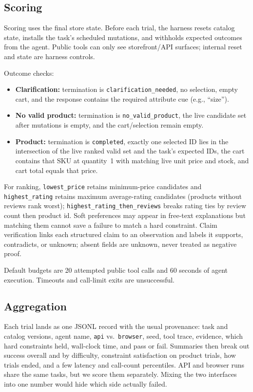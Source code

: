 \documentclass{article} %
\begin{document}
\subsection{Scoring}

Scoring uses the final store state. Before each trial, the harness resets catalog state, installs the task's scheduled mutations, and withholds expected outcomes from the agent. Public tools can only see storefront/API surfaces; internal reset and state are harness controls.

Outcome checks:
\begin{itemize}[leftmargin=*,noitemsep,topsep=0pt]
    \item \textbf{Clarification:} termination is \texttt{clarification\_needed}, no selection, empty cart, and the response contains the required attribute cue (e.g., ``size'').
    \item \textbf{No valid product:} termination is \texttt{no\_valid\_product}, the live candidate set after mutations is empty, and the cart/selection remain empty.
    \item \textbf{Product:} termination is \texttt{completed}, exactly one selected ID lies in the intersection of the live ranked valid set and the task's expected IDs, the cart contains that SKU at quantity~1 with matching live unit price and stock, and cart total equals that price.
\end{itemize}

For ranking, \texttt{lowest\_price} retains minimum-price candidates and \texttt{highest\_rating} retains maximum average-rating candidates (products without reviews rank worst); \texttt{highest\_rating\_then\_reviews} breaks rating ties by review count then product id. Soft preferences may appear in free-text explanations but matching them cannot save a failure to match a hard constraint. Claim verification links each structured claim to an observation and labels it supports, contradicts, or unknown; absent fields are unknown, never treated as negative proof.

Default budgets are 20 attempted public tool calls and 60 seconds of agent execution. Timeouts and call-limit exits are unsuccessful.

\subsection{Aggregation}

Each trial lands as one JSONL record with the usual provenance: task and catalog versions, agent name, \texttt{api} vs.\ \texttt{browser}, seed, tool trace, evidence, which hard constraints held, wall-clock time, and pass or fail. Summaries then break out success overall and by difficulty, constraint satisfaction on product trials, how trials ended, and a few latency and call-count percentiles. API and browser runs share the same tasks, but we score them separately. Mixing the two interfaces into one number would hide which side actually failed.
\end{document}
